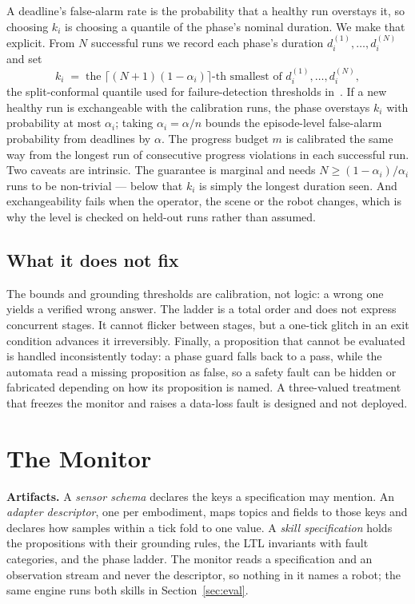 \documentclass[letterpaper, 10pt, journal, twoside]{IEEEtran}
\begin{document}
A deadline's false-alarm rate is the probability that a healthy run
overstays it, so choosing $k_i$ is choosing a quantile of the phase's
nominal duration. We make that explicit. From $N$ successful runs we
record each phase's duration $d_i^{(1)}, \dots, d_i^{(N)}$ and set
\[
k_i \;=\; \text{the } \lceil (N+1)(1-\alpha_i) \rceil\text{-th smallest
of } d_i^{(1)}, \dots, d_i^{(N)},
\]
the split-conformal quantile used for failure-detection thresholds
in~\cite{xu2025faildetect}. If a new healthy run is exchangeable with
the calibration runs, the phase overstays $k_i$ with probability at most
$\alpha_i$; taking $\alpha_i = \alpha / n$ bounds the episode-level
false-alarm probability from deadlines by $\alpha$. The progress budget
$m$ is calibrated the same way from the longest run of consecutive
progress violations in each successful run. Two caveats are intrinsic.
The guarantee is marginal and needs $N \geq (1-\alpha_i)/\alpha_i$ runs
to be non-trivial --- below that $k_i$ is simply the longest duration
seen. And exchangeability fails when the operator, the scene or the
robot changes, which is why the level is checked on held-out runs rather
than assumed.

\subsection{What it does not fix}

The bounds and grounding thresholds are calibration, not logic: a wrong
one yields a verified wrong answer. The ladder is a total order and does
not express concurrent stages. It cannot flicker between stages, but a
one-tick glitch in an exit condition advances it irreversibly. Finally,
a proposition that cannot be evaluated is handled inconsistently today:
a phase guard falls back to a pass, while the automata read a missing
proposition as false, so a safety fault can be hidden or fabricated
depending on how its proposition is named. A three-valued treatment that
freezes the monitor and raises a data-loss fault is designed and not
deployed.

\section{The Monitor}
\label{sec:system}

\textbf{Artifacts.} A \emph{sensor schema} declares the keys a
specification may mention. An \emph{adapter descriptor}, one per
embodiment, maps topics and fields to those keys and declares how
samples within a tick fold to one value. A \emph{skill specification}
holds the propositions with their grounding rules, the LTL invariants
with fault categories, and the phase ladder. The monitor reads a
specification and an observation stream and never the descriptor, so
nothing in it names a robot; the same engine runs both skills in
Section~\ref{sec:eval}.
\end{document}
